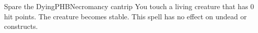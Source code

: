 \begin{spell}{Spare the Dying}{PHB}{Necromancy cantrip}
{
}
You touch a living creature that has 0 hit points. The
creature becomes stable. This spell has no effect on undead
or constructs.
\end{spell}
